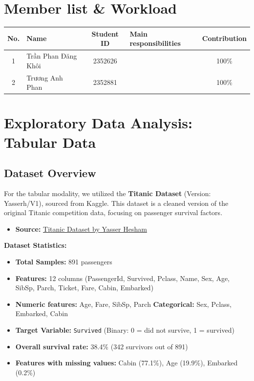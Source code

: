 \documentclass[twoside]{hcmut-report}
\begin{document}
\section*{Member list \& Workload}
\begin{center}
\begin{table}[h]
\renewcommand\thetable{1}
\centering
\small
\begin{tabular}{|c|l|c|p{6cm}|c|}
\hline
\textbf{No.} & \textbf{Name } & \textbf{Student ID} &
\textbf{Main responsibilities} & \textbf{Contribution} \\
\hline
1 & Trần Phan Đăng Khôi &  2352626 &
 & 100\% \\
\hline
2 & Trương Anh Phan & 2352881 &
 & 100\% \\
\hline
\end{tabular}
\end{table}

\end{center}
\clearpage
 

\tableofcontents

\clearpage


\section{Exploratory Data Analysis: Tabular Data}
\label{sec:tabular}
\subsection{Dataset Overview}
For the tabular modality, we utilized the \textbf{Titanic Dataset} (Version: Yasserh/V1), sourced from Kaggle. This dataset is a cleaned version of the original Titanic competition data, focusing on passenger survival factors.

\begin{itemize}
    \item \textbf{Source:} \href{https://www.kaggle.com/datasets/yasserh/titanic-dataset}{Titanic Dataset by Yasser Hesham}
\end{itemize}

\begin{importantbox}
\textbf{Dataset Statistics:}
\begin{itemize}
    \item \textbf{Total Samples:} 891 passengers
    \item \textbf{Features:} 12 columns (PassengerId, Survived, Pclass, Name, Sex, Age, SibSp, Parch, Ticket, Fare, Cabin, Embarked)
    \item \textbf{Numeric features:} Age, Fare, SibSp, Parch \quad \textbf{Categorical:} Sex, Pclass, Embarked, Cabin
    \item \textbf{Target Variable:} \texttt{Survived} (Binary: 0 = did not survive, 1 = survived)
    \item \textbf{Overall survival rate:} 38.4\% (342 survivors out of 891)
    \item \textbf{Features with missing values:} Cabin (77.1\%), Age (19.9\%), Embarked (0.2\%)
\end{itemize}
\end{importantbox}
\end{document}
